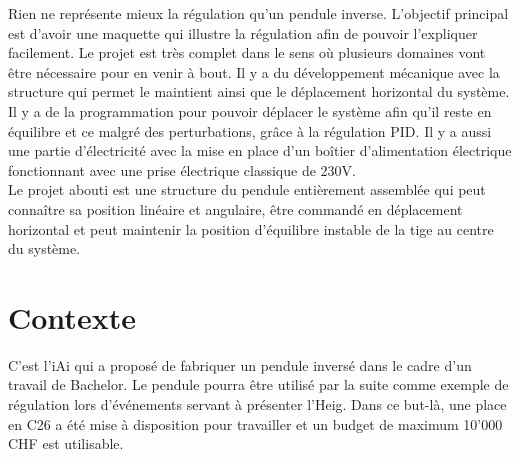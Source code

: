 Rien ne représente mieux la régulation qu'un pendule inverse. L'objectif principal est d'avoir une maquette qui illustre la régulation
afin de pouvoir l'expliquer facilement. Le projet est très complet dans le sens où plusieurs domaines vont être nécessaire pour en venir
à bout. Il y a du développement mécanique avec la structure qui permet le maintient ainsi que le déplacement horizontal du système.
Il y a de la programmation pour pouvoir déplacer le système afin qu'il reste en équilibre et ce malgré des perturbations, grâce à la
régulation \gls{PID}. Il y a aussi une partie d'électricité avec la mise en place d'un boîtier d'alimentation électrique fonctionnant avec une
prise électrique classique de 230V.\\

Le projet abouti est une structure du pendule entièrement assemblée qui peut connaître sa position linéaire et angulaire, être commandé
en déplacement horizontal et peut maintenir la position d'équilibre instable de la tige au centre du système.

\section{Contexte}
C'est l'\acrlong{iAi} qui a proposé de fabriquer un pendule inversé dans le cadre d'un travail
de Bachelor. Le pendule pourra être utilisé par la suite comme exemple de régulation lors d'événements servant à présenter l'\acrshort{Heig}.
Dans ce but-là, une place en C26 a été mise à disposition pour travailler et un budget de maximum 10'000 CHF est utilisable.